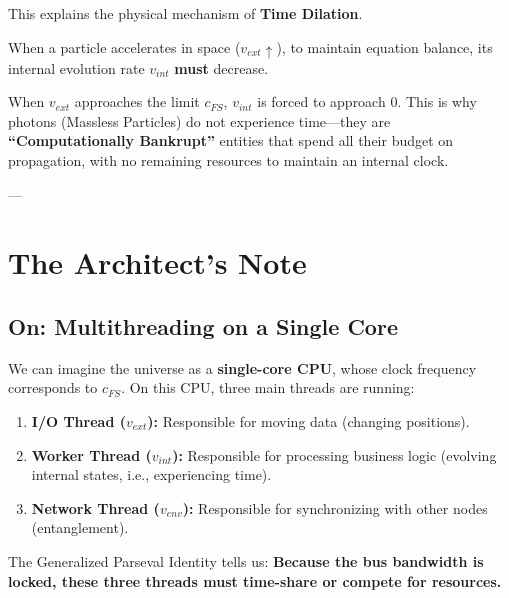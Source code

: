 This explains the physical mechanism of \textbf{Time Dilation}.

When a particle accelerates in space (\textbf{$v_{ext} \uparrow$}), to maintain equation balance, its internal evolution rate \textbf{$v_{int}$} \textbf{must} decrease.

When \textbf{$v_{ext}$} approaches the limit \textbf{$c_{FS}$}, \textbf{$v_{int}$} is forced to approach 0. This is why photons (Massless Particles) do not experience time---they are \textbf{``Computationally Bankrupt''} entities that spend all their budget on propagation, with no remaining resources to maintain an internal clock.

---

\section{The Architect's Note}

\subsection{On: Multithreading on a Single Core}

We can imagine the universe as a \textbf{single-core CPU}, whose clock frequency corresponds to \textbf{$c_{FS}$}. On this CPU, three main threads are running:

\begin{enumerate}
\item \textbf{I/O Thread ($v_{ext}$):} Responsible for moving data (changing positions).

\item \textbf{Worker Thread ($v_{int}$):} Responsible for processing business logic (evolving internal states, i.e., experiencing time).

\item \textbf{Network Thread ($v_{env}$):} Responsible for synchronizing with other nodes (entanglement).
\end{enumerate}

The Generalized Parseval Identity tells us: \textbf{Because the bus bandwidth is locked, these three threads must time-share or compete for resources.}

